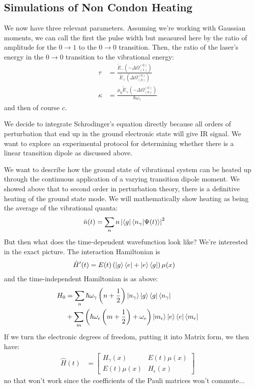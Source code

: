 \subsection{Simulations of Non Condon Heating}
We now have three relevant parameters.  Assuming we're working with Gaussian moments, we can call the first the pulse width but measured here by the ratio of amplitude for the $0\rightarrow1$ to the $0\rightarrow0$ transition.  Then, the ratio of the laser's energy in the $0\rightarrow0$ transition to the vibrational energy:
\begin{align}
	\tau &= \frac{\tilde{E}_{-}\left(-\Delta \Omega_{(1)}^{(0)}\right)}{\tilde{E}_{+} \left(\Delta \Omega_{(0)}^{(0)}\right) } \\
	\kappa &= \frac{\mu_0 \tilde{E}_{+}\left(-\Delta \Omega_{(0)}^{(0)}\right)}{\hbar \omega_{\gamma} }
\end{align}
and then of course $c$.

We decide to integrate Schrodinger's equation directly because all orders of perturbation that end up in the ground electronic state will give IR signal.  We want to explore an experimental protocol for determining whether there is a linear transition dipole as discussed above.


We want to describe how the ground state of vibrational system can be heated up through the continuous application of a varying transition dipole moment.  We showed above that to second order in perturbation theory, there is a definitive heating of the ground state mode.  We will mathematically show heating as being the average of the vibrational quanta:
\begin{align*}
	\bar{n}(t) &= \sum_{n} n \left| \bra{g}\braket{n_{\gamma} | \Psi(t)} \right|^2
\end{align*}
But then what does the time-dependent wavefunction look like?  We're interested in the exact picture.  The interaction Hamiltonian is
\begin{align*}
	\hat{H}'(t) &= E(t)  \left(\ket{g}\bra{e} + \ket{e}\bra{g}\right)\mu(x)
\end{align*}
and the time-independent Hamiltonian is as above:
\begin{align}
	H_0 &=  \sum_n \hbar \omega_{\gamma}  \left(n + \frac{1}{2} \right)  \ket{n_{\gamma}}\ket{g}\bra{g} \bra{n_{\gamma}} \\
   &+ \sum_m \left(  \hbar \omega_{\epsilon}  \left(m + \frac{1}{2} \right) + \omega_e \right)  \ket{m_{\epsilon}} \ket{e}\bra{e} \bra{m_{\epsilon}}
\end{align}
If we turn the electronic degrees of freedom, putting it into Matrix form, we then have:
\begin{align*}
	\hat{H}(t) &=
	\begin{bmatrix}
	H_{\gamma}(x) & E(t)\mu(x) \\
	E(t)\mu(x) & H_{\epsilon}(x)
	\end{bmatrix}
\end{align*}
no that won't work since the coefficients of the Pauli matrices won't commute...

